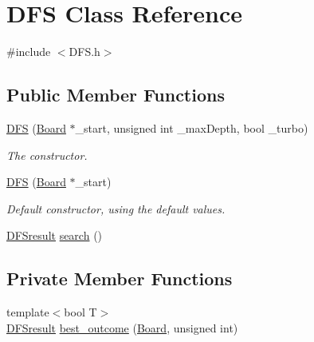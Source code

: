 \hypertarget{classDFS}{}\section{D\+FS Class Reference}
\label{classDFS}


{\ttfamily \#include $<$D\+F\+S.\+h$>$}

\subsection*{Public Member Functions}
\begin{DoxyCompactItemize}
\item 
\hyperlink{classDFS_a8db913929c53b5cba8f145c281ef99f8}{D\+FS} (\hyperlink{classBoard}{Board} $\ast$\+\_\+start, unsigned int \+\_\+max\+Depth, bool \+\_\+turbo)
\begin{DoxyCompactList}\small\item\em The constructor. \end{DoxyCompactList}\item 
\hyperlink{classDFS_ac8748bddd420ae23a10620cb4b5714c5}{D\+FS} (\hyperlink{classBoard}{Board} $\ast$\+\_\+start)\hypertarget{classDFS_ac8748bddd420ae23a10620cb4b5714c5}{}\label{classDFS_ac8748bddd420ae23a10620cb4b5714c5}

\begin{DoxyCompactList}\small\item\em Default constructor, using the default values. \end{DoxyCompactList}\item 
\hyperlink{structDFSresult}{D\+F\+Sresult} \hyperlink{classDFS_a49982f77146f1839b15a36c6974e43d1}{search} ()
\end{DoxyCompactItemize}
\subsection*{Private Member Functions}
\begin{DoxyCompactItemize}
\item 
{\footnotesize template$<$bool T$>$ }\\\hyperlink{structDFSresult}{D\+F\+Sresult} \hyperlink{classDFS_a8b4c8f013eb056faee52530deb5a9971}{best\+\_\+outcome} (\hyperlink{classBoard}{Board}, unsigned int)
\end{DoxyCompactItemize}
